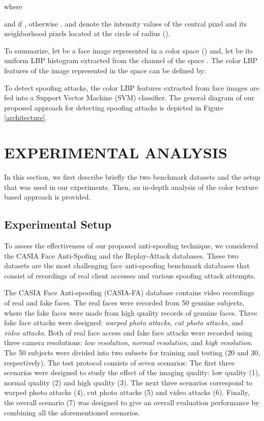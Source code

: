 \documentclass{article}
\begin{document}
where

and  if , otherwise .  and  denote the intensity values of the central pixel  and its  neighborhood pixels located at the circle of radius  ().  

To summarize, let  be a face image represented in a color space  () and, let  be its uniform LBP histogram extracted from the  channel of the space . The color LBP features of the image  represented in the space  can be defined by:
 
To detect spoofing  attacks, the color LBP features extracted from  face images are fed into a Support Vector Machine (SVM) classifier. The general  diagram of our proposed approach for detecting spoofing attacks is depicted in Figure \ref{architecture}.
\vspace{-6mm}
\section{EXPERIMENTAL ANALYSIS}
	\vspace{-2mm}
\label{sec:experiments} 
In this section, we first describe briefly the two benchmark datasets and the setup that was used in our experiments. Then, an in-depth analysis of the color texture based approach is provided.
\vspace{-2mm}
\subsection{ Experimental Setup}
To assess the effectiveness of our proposed anti-spoofing technique, we considered the CASIA Face Anti-Spofing and the Replay-Attack databases. These two datasets are the most challenging  face anti-spoofing benchmark databases that consist of recordings of real client accesses and various spoofing attack attempts.

The CASIA Face Anti-spoofing (CASIA-FA) database \cite{casia} contains video recordings of real and fake faces. The real faces were recorded from 50 genuine subjects, where the fake faces were made from high quality records of genuine faces. Three fake face attacks were designed: \textit{warped photo attacks}, \textit{cut photo attacks}, and \textit{video attacks}. Both of real face access and fake face attacks were recorded using three camera resolutions: \textit{low resolution}, \textit{normal resolution}, and \textit{high resolution}. The 50 subjects were divided into two subsets for training and testing (20 and 30, respectively). The test protocol consists of seven scenarios: The first three scenarios were designed to study the effect of the imaging quality: low  quality (1), normal quality (2) and high quality (3). The next three scenarios correspond to warped photo attacks (4), cut photo attacks (5) and video attacks (6). Finally, the overall scenario (7) was designed to give an overall evaluation performance by combining all the aforementioned scenarios.
\end{document}
